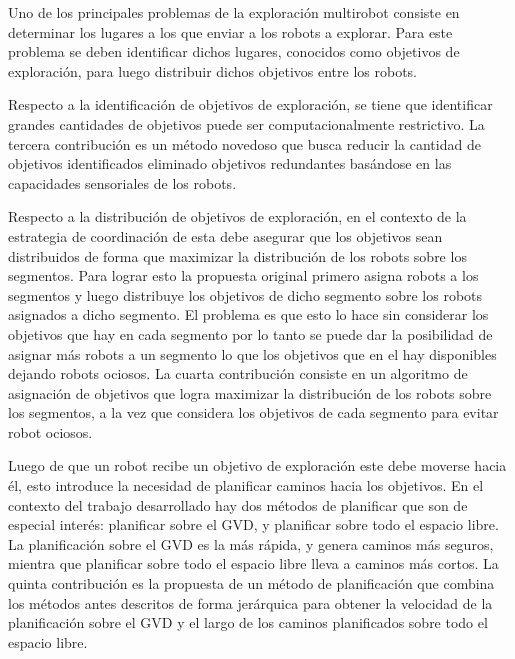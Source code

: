 Uno de los principales problemas de la exploración multirobot consiste en
determinar los lugares a los que enviar a los robots a explorar. Para este
problema se deben identificar dichos lugares, conocidos como objetivos de
exploración, para luego distribuir dichos objetivos entre los robots.

Respecto a la identificación de objetivos de exploración, se tiene que
identificar grandes cantidades de objetivos puede ser computacionalmente
restrictivo. La tercera contribución es un método novedoso que busca reducir la
cantidad de objetivos identificados eliminado objetivos redundantes basándose en
las capacidades sensoriales de los robots. 

Respecto a la distribución de objetivos de exploración, en el contexto de la
estrategia de coordinación de \cite{wurm2008coordinated} esta debe asegurar que
los objetivos sean distribuidos de forma que maximizar la distribución de los
robots sobre los segmentos. Para lograr esto la propuesta original primero
asigna robots a los segmentos y luego distribuye los objetivos de dicho segmento
sobre los robots asignados a dicho segmento. El problema es que esto lo hace sin
considerar los objetivos que hay en cada segmento por lo tanto se puede dar la
posibilidad de asignar más robots a un segmento lo que los objetivos que en el
hay disponibles dejando robots  ociosos. La cuarta contribución consiste en un
algoritmo de asignación de objetivos que logra maximizar la distribución de los
robots sobre los segmentos, a la vez que considera los objetivos de cada
segmento para evitar robot ociosos.

Luego de que un robot recibe un objetivo de exploración este debe moverse hacia
él, esto introduce la necesidad de planificar caminos hacia los objetivos. En el
contexto del trabajo desarrollado hay dos métodos de planificar que son de
especial interés: planificar sobre el GVD, y planificar sobre todo el espacio
libre. La planificación sobre el GVD es la más rápida, y genera caminos más
seguros, mientra que planificar sobre todo el espacio libre lleva a caminos más
cortos. La quinta contribución es la propuesta de un método de planificación
que combina los métodos antes descritos de forma jerárquica para obtener la
velocidad de la planificación sobre el GVD y el largo de los caminos
planificados sobre todo el espacio libre.




